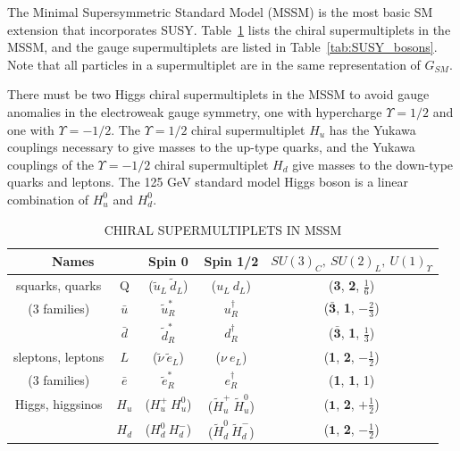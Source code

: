 The Minimal Supersymmetric Standard Model (MSSM) is the most basic SM extension that incorporates SUSY. Table~\ref{tab:SUSY_fermions} lists the chiral supermultiplets in the MSSM, and the gauge supermultiplets are listed in Table~\ref{tab:SUSY_bosons}. Note that all particles in a supermultiplet are in the same representation of $G_{SM}$. 

There must be two Higgs chiral supermultiplets in the MSSM to avoid gauge anomalies in the electroweak gauge symmetry, one with hypercharge $\Upsilon = 1/2$ and one with $\Upsilon = -1/2$. The $\Upsilon = 1/2$ chiral supermultiplet $H_u$ has the Yukawa couplings necessary to give masses to the up-type quarks, and the Yukawa couplings of the $\Upsilon = -1/2$ chiral supermultiplet $H_d$ give masses to the down-type quarks and leptons. The 125 GeV standard model Higgs boson is a linear combination of $H_u^0$ and $H_d^0$.


\begin{table}[ht]
    \caption{CHIRAL SUPERMULTIPLETS IN MSSM}
    \centering
    \begin{tabular}{|c|c|c|c|c|}
    \hline
    \hline
    \multicolumn{2}{|c|}{Names} & Spin 0 & Spin 1/2 &$SU(3)_C,~SU(2)_L,~U(1)_\Upsilon $\\
  	  \hline
           \hline    
squarks, quarks  & Q & ($\tilde{u}_L~\tilde{d}_L$) & ($u_L~d_L$)  & (\textbf{3}, \textbf{2}, $\frac{1}{6}$) \\
(3 families) & $\bar{u}$ & $\tilde{u}_R^\ast$ & $u_R^\dagger$ & ($\bar{\textbf{3}}$, \textbf{1}, $-\frac{2}{3}$) \\
                   & $\bar{d}$ & $\tilde{d}_R^*$     & $d_R^\dagger$ & ($\bar{\textbf{3}}$, \textbf{1}, $\frac{1}{3}$) \\
                   \hline
sleptons, leptons  & $L$ & ($\tilde{\nu}~\tilde{e}_L$) & ($\nu~e_L$)      &  (\textbf{1}, \textbf{2}, $-\frac{1}{2}$) \\
(3 families) & $\bar{e}$ & $\tilde{e}_R^\ast$  & $e_R^\dagger$ &  (\textbf{1}, \textbf{1}, 1) \\
\hline
Higgs, higgsinos & $H_u$  & ($H_u^+ ~ H_u^0$) & ($\tilde{H}_u^+ ~ \tilde{H}_u^0$) & ($\textbf{1}$, \textbf{2}, $+\frac{1}{2}$) \\
                           & $H_d$  & ($H_d^0 ~ H_d^-$) & ($\tilde{H}_d^0 ~ \tilde{H}_d^-$) & ($\textbf{1}$, \textbf{2}, $-\frac{1}{2}$) \\
           \hline
           \hline
    \end{tabular}
    \label{tab:SUSY_fermions}
\end{table}


